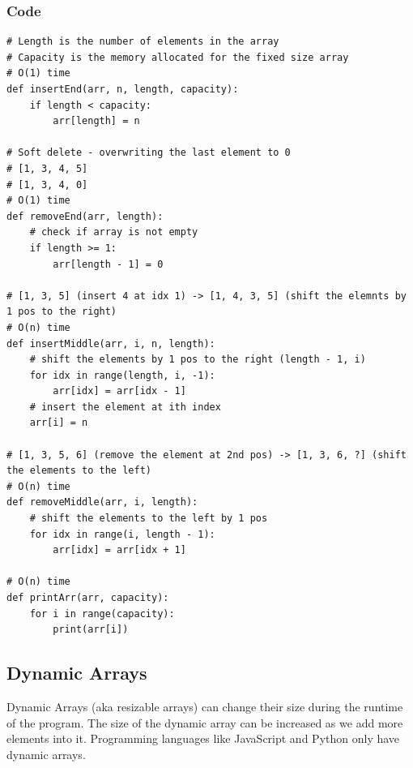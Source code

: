 \documentclass[12pt,a4paper]{article}
\begin{document}
\subsubsection{Code}
\begin{verbatim}
# Length is the number of elements in the array
# Capacity is the memory allocated for the fixed size array
# O(1) time
def insertEnd(arr, n, length, capacity):
    if length < capacity:
        arr[length] = n

# Soft delete - overwriting the last element to 0
# [1, 3, 4, 5]
# [1, 3, 4, 0]
# O(1) time
def removeEnd(arr, length):
    # check if array is not empty
    if length >= 1:
        arr[length - 1] = 0

# [1, 3, 5] (insert 4 at idx 1) -> [1, 4, 3, 5] (shift the elemnts by 1 pos to the right)
# O(n) time
def insertMiddle(arr, i, n, length):
    # shift the elements by 1 pos to the right (length - 1, i)
    for idx in range(length, i, -1):
        arr[idx] = arr[idx - 1]
    # insert the element at ith index
    arr[i] = n

# [1, 3, 5, 6] (remove the element at 2nd pos) -> [1, 3, 6, ?] (shift the elements to the left)
# O(n) time
def removeMiddle(arr, i, length):
    # shift the elements to the left by 1 pos
    for idx in range(i, length - 1):
        arr[idx] = arr[idx + 1]

# O(n) time
def printArr(arr, capacity):
    for i in range(capacity):
        print(arr[i])
\end{verbatim}


\subsection{Dynamic Arrays}
Dynamic Arrays (aka resizable arrays) can change their size during the runtime of the program. The size of the dynamic array can be increased as we add more elements into it. Programming languages like JavaScript and Python only have dynamic arrays.
\end{document}
